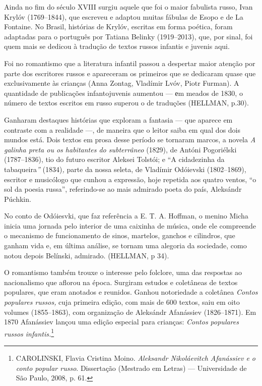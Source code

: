Ainda no fim do século XVIII surgiu aquele que foi o maior fabulista
russo, Ivan Krylóv (1769--1844), que escreveu e adaptou muitas fábulas
de Esopo e de La Fontaine. No Brasil, histórias de Krylóv, escritas em
forma poética, foram adaptadas para o português por Tatiana Belinky
(1919--2013), que, por sinal, foi quem mais se dedicou à tradução de
textos russos infantis e juvenis aqui.

Foi no romantismo que a literatura infantil passou a despertar maior
atenção por parte dos escritores russos e apareceram os primeiros que se
dedicaram quase que exclusivamente às crianças (Anna Zontag, Vladímir
Lvóv, Piotr Furman). A quantidade de publicações infantojuvenis aumentou
--- еm meados de 1830, o número de textos escritos em russo superou o de
traduções (HELLMAN, p.30).

Ganharam destaques histórias que exploram a fantasia --- que aparece em
contraste com a realidade ---, de maneira que o leitor saiba em qual dos
dois mundos está. Dois textos em prosa desse período se tornaram marcos,
a novela \emph{A galinha preta ou os habitantes do subterrâneo} (1829),
de Antóni Pogoriélski (1787--1836), tio do futuro escritor Aleksei
Tolstói; e ``A cidadezinha da tabaqueira\emph{''} (1834)\emph{,} parte
da nossa seleta, de Vladímir Odóievski (1802--1869), escritor e
musicólogo que cunhou a expressão, hoje repetida aos quatro ventos, ``o
sol da poesia russa'', referindo-se ao mais admirado poeta do país,
Aleksándr Púchkin.

No conto de Odóiesvki, que faz referência a E. T. A. Hoffman, o menino
Micha inicia uma jornada pelo interior de uma caixinha de música, onde
ele compreende o mecanismo de funcionamento de sinos, martelos, ganchos
e cilindros, que ganham vida e, em última análise, se tornam uma
alegoria da sociedade, como notou depois Belínski, admirado. (HELLMAN, p
34).

O romantismo também trouxe o interesse pelo folclore, uma das respostas
ao nacionalismo que aflorou na época. Surgiram estudos e coletâneas de
textos populares, que eram anotados e reunidos. Ganhou notoriedade a
coletânea \emph{Contos populares russos,} cuja primeira edição, com mais
de 600 textos, saiu em oito volumes (1855--1863), com organização de
Aleksándr Afanássiev (1826--1871). Em 1870 Afanássiev lançou uma edição
especial para crianças: \emph{Contos populares russos
infantis.}\footnote{CAROLINSKI, Flavia Cristina Moino. \emph{Aleksandr
  Nikoláevitch Afanássiev e o conto popular russo}. Dissertação
  (Mestrado em Letras) --- Universidade de São Paulo, 2008, p. 61.}

